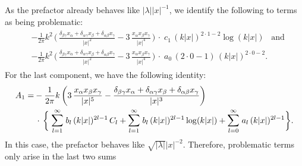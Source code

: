As the prefactor already behaves like $|\lambda| |x|^{-1}$, we identify the following to terms as being problematic:
\begin{align}
  \label{eq:P2}
  \tag{P2}
  \begin{alignedat}{1}
  & - \frac{1}{2\pi} k^2\, \bigg(\, \frac{\delta_{\beta\gamma} x_\alpha + \delta_{\alpha \gamma} x_\beta + \delta_{\alpha \beta} x_\gamma}{|x|^2} - 3\, \frac{x_\alpha x_\beta x_\gamma}{|x|^4} \, \bigg) 
    \, \cdot\;  c_1 \, (k|x|)^{2 \cdot 1 - 2} \log(k|x|) \;\;\;\text{and}\\[0.5em]
   &- \frac{1}{2\pi} k^2 \,\bigg(\, \frac{\delta_{\beta\gamma} x_\alpha + \delta_{\alpha \gamma} x_\beta + \delta_{\alpha \beta} x_\gamma}{|x|^2} - 3\, \frac{x_\alpha x_\beta x_\gamma}{|x|^4} \, \bigg) 
  \, \cdot \; a_0\, (2\cdot 0 - 1) \, (k|x|)^{2 \cdot 0 - 2} .
  \end{alignedat}
\end{align}
For the last component, we have the following identity:
\begin{align*}
  A_1 = 
  & - \frac{1}{2\pi} k\, \bigg( 3\, \frac{x_\alpha x_\beta x_\gamma}{|x|^5} - \frac{\delta_{\beta\gamma} x_\alpha + \delta_{\alpha\gamma} x_\beta + \delta_{\alpha\beta} x_\gamma}{|x|^3} \bigg)  \\
  &\,\cdot\, \bigg\{ 
  \; \mathlarger{\sum}_{l = 1}^\infty \; b_l \, (k|x|)^{2l - 1} \, C_l 
  + \mathlarger{\sum}_{l = 1}^\infty \; b_l \, (k|x|)^{2l - 1} \log(k|x|) 
  + \mathlarger{\sum}_{l = 0}^\infty \; a_l \, (k|x|)^{2l - 1} 
  \bigg\}.
\end{align*}
In this case, the prefactor behaves like $\sqrt{|\lambda|} |x|^{-2}$.
Therefore, problematic terms only arise in the last two sums
